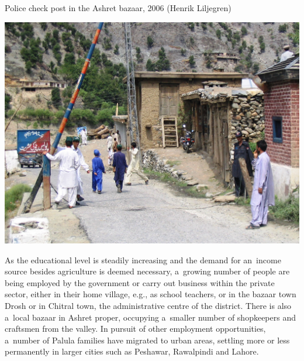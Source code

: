 \begin{photofigure}[t]
\caption{Police check post in the Ashret bazaar, 2006 (Henrik Liljegren)}
\includegraphics[width=\textwidth]{photos/Photo04--CheckpostAshret.JPG}
\end{photofigure}

As the educational level is steadily increasing and the demand for an~income source besides agriculture is deemed necessary, a~growing number of people are being employed by the government or carry out business within the private sector, either in their home village, e.g., as school teachers, or in the bazaar town Drosh or in Chitral town, the administrative centre of the district. There is also a~local bazaar in Ashret proper, occupying a~smaller number of shopkeepers and craftsmen from the valley. In pursuit of other employment opportunities, a~number of Palula families have migrated to urban areas, settling more or less permanently in larger cities such as Peshawar, Rawalpindi and Lahore.
 

